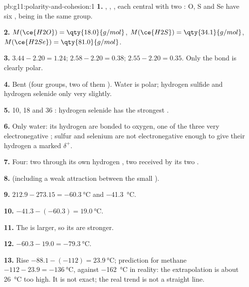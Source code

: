 \begin{solution}{pb:g11:polarity-and-cohesion:1}
\textbf{1.} , , , each central  with
two : O, S and Se have six , being in the
same group.

\textbf{2.} $M(\ce{H2O}) = \qty{18.0}{g/mol}$, $M(\ce{H2S}) =
\qty{34.1}{g/mol}$, $M(\ce{H2Se}) = \qty{81.0}{g/mol}$.

\textbf{3.} $3.44 - 2.20 = 1.24$; $2.58 - 2.20 = 0.38$;
$2.55 - 2.20 = 0.35$. Only the  bond is clearly polar.

\textbf{4.} Bent (four groups, two of them ). Water is polar;
hydrogen sulfide and hydrogen selenide only very slightly.

\textbf{5.} 10, 18 and 36 : hydrogen selenide has the strongest
.

\textbf{6.} Only water: its hydrogen  are bonded to oxygen, one of
the three very electronegative ; sulfur and selenium are not
electronegative enough to give their hydrogen  a marked
$\delta^+$.

\textbf{7.} Four: two through its own hydrogen , two received by its
two .

\textbf{8.}  (including a weak attraction
between the small ).

\textbf{9.} $212.9 - 273.15 = \qty{-60.3}{\celsius}$ and
\qty{-41.3}{\celsius}.

\textbf{10.} $-41.3 - (-60.3) = \qty{19.0}{\celsius}$.

\textbf{11.} The  is larger, so its 
are stronger.

\textbf{12.} $-60.3 - 19.0 = \qty{-79.3}{\celsius}$.

\textbf{13.} Rise $-88.1 - (-112) = \qty{23.9}{\celsius}$; prediction for
methane $-112 - 23.9 = \qty{-136}{\celsius}$, against \qty{-162}{\celsius}
in reality: the extrapolation is about \qty{26}{\celsius} too high. It is
not exact; the real trend is not a straight line.


\end{solution}
